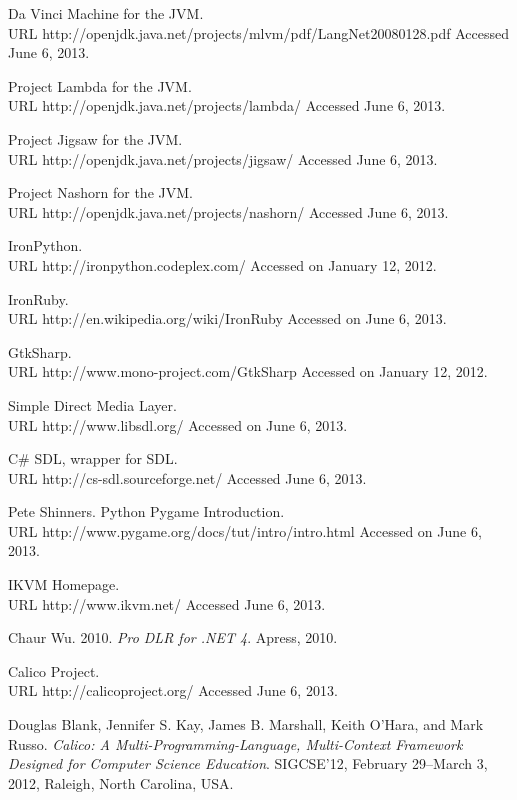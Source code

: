 \documentclass[preprint]{sigplanconf}
\begin{document}
\begin{thebibliography}{}
\softraggedright

Da Vinci Machine for the JVM.\\ URL http://openjdk.java.net/projects/mlvm/pdf/LangNet20080128.pdf Accessed June 6, 2013.

Project Lambda for the JVM.\\ URL http://openjdk.java.net/projects/lambda/ Accessed June 6, 2013.

Project Jigsaw for the JVM.\\ URL http://openjdk.java.net/projects/jigsaw/ Accessed June 6, 2013.

Project Nashorn for the JVM.\\ URL http://openjdk.java.net/projects/nashorn/ Accessed June 6, 2013.

IronPython.\\ URL http://ironpython.codeplex.com/ Accessed on January 12, 2012.

IronRuby.\\ URL http://en.wikipedia.org/wiki/IronRuby Accessed on June 6, 2013.

GtkSharp.\\ URL http://www.mono-project.com/GtkSharp Accessed on January 12, 2012.

Simple Direct Media Layer.\\ URL http://www.libsdl.org/ Accessed on June 6, 2013.

C\# SDL, wrapper for SDL.\\ URL http://cs-sdl.sourceforge.net/ Accessed June 6, 2013.

Pete Shinners. Python Pygame Introduction.\\ URL http://www.pygame.org/docs/tut/intro/intro.html Accessed on June 6, 2013.

IKVM Homepage.\\ URL http://www.ikvm.net/ Accessed June 6, 2013.

Chaur Wu. 2010. \textit{Pro DLR for .NET 4}. Apress, 2010.

Calico Project.\\ URL http://calicoproject.org/ Accessed June 6, 2013.

 Douglas Blank, Jennifer S. Kay, James
  B. Marshall, Keith O'Hara, and Mark Russo. \textit{Calico: A
    Multi-Programming-Language, Multi-Context Framework Designed for
    Computer Science Education}.  SIGCSE’12, February 29–March 3,
  2012, Raleigh, North Carolina, USA.


\end{thebibliography}
\end{document}
